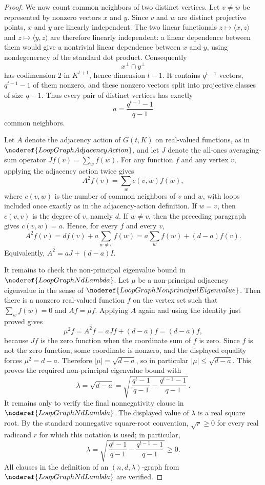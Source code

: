 \begin{proof}
We now count common neighbors of two distinct vertices. Let \(v\ne w\) be represented by nonzero vectors \(x\) and \(y\). Since \(v\) and \(w\) are distinct projective points, \(x\) and \(y\) are linearly independent. The two linear functionals \(z\mapsto \langle x,z\rangle\) and \(z\mapsto \langle y,z\rangle\) are therefore linearly independent: a linear dependence between them would give a nontrivial linear dependence between \(x\) and \(y\), using nondegeneracy of the standard dot product. Consequently
\[
  x^\perp\cap y^\perp
\]
has codimension \(2\) in \(K^{t+1}\), hence dimension \(t-1\). It contains \(q^{t-1}\) vectors, \(q^{t-1}-1\) of them nonzero, and these nonzero vectors split into projective classes of size \(q-1\). Thus every pair of distinct vertices has exactly
\[
  a=\frac{q^{t-1}-1}{q-1}
\]
common neighbors.

Let \(A\) denote the adjacency action of \(G(t,K)\) on real-valued functions, as in \(\noderef{LoopGraphAdjacencyAction}\), and let \(J\) denote the all-ones averaging-sum operator \(Jf(v)=\sum_w f(w)\). For any function \(f\) and any vertex \(v\), applying the adjacency action twice gives
\[
  A^2 f(v)=\sum_w c(v,w)f(w),
\]
where \(c(v,w)\) is the number of common neighbors of \(v\) and \(w\), with loops included once exactly as in the adjacency-action definition. If \(w=v\), then \(c(v,v)\) is the degree of \(v\), namely \(d\). If \(w\ne v\), then the preceding paragraph gives \(c(v,w)=a\). Hence, for every \(f\) and every \(v\),
\[
  A^2 f(v)=d f(v)+a\sum_{w\ne v}f(w)
          =a\sum_w f(w)+(d-a)f(v).
\]
Equivalently, \(A^2=aJ+(d-a)I\).

It remains to check the non-principal eigenvalue bound in \(\noderef{LoopGraphNdLambda}\). Let \(\mu\) be a non-principal adjacency eigenvalue in the sense of \(\noderef{LoopGraphNonprincipalEigenvalue}\). Then there is a nonzero real-valued function \(f\) on the vertex set such that \(\sum_w f(w)=0\) and \(Af=\mu f\). Applying \(A\) again and using the identity just proved gives
\[
  \mu^2 f=A^2f=aJf+(d-a)f=(d-a)f,
\]
because \(Jf\) is the zero function when the coordinate sum of \(f\) is zero. Since \(f\) is not the zero function, some coordinate is nonzero, and the displayed equality forces \(\mu^2=d-a\). Therefore \(|\mu|=\sqrt{d-a}\), so in particular \(|\mu|\le \sqrt{d-a}\). This proves the required non-principal eigenvalue bound with
\[
  \lambda=\sqrt{d-a}
  =\sqrt{\,\frac{q^t-1}{q-1}-\frac{q^{t-1}-1}{q-1}\,}.
\]
It remains only to verify the final nonnegativity clause in \(\noderef{LoopGraphNdLambda}\). The displayed value of \(\lambda\) is a real square root. By the standard nonnegative square-root convention, \(\sqrt r\ge 0\) for every real radicand \(r\) for which this notation is used; in particular,
\[
  \lambda
  =
  \sqrt{\,\frac{q^t-1}{q-1}-\frac{q^{t-1}-1}{q-1}\,}
  \ge 0.
\]
All clauses in the definition of an \((n,d,\lambda)\)-graph from \(\noderef{LoopGraphNdLambda}\) are verified.
\end{proof}
